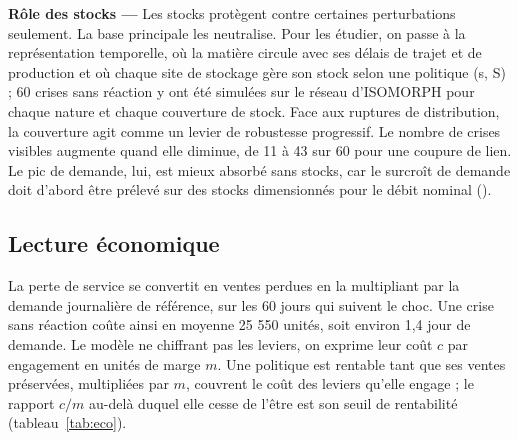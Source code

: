 \begin{center}
\begin{minipage}{\textwidth}\centering

\label{fig:carte}
\end{minipage}
\end{center}

\label{sec:4.4}

\textbf{Rôle des stocks — }Les stocks protègent contre certaines perturbations seulement. La base principale les neutralise. Pour les étudier, on passe à la représentation temporelle, où la matière circule avec ses délais de trajet et de production et où chaque site de stockage gère son stock selon une politique (s, S) ; 60 crises sans réaction y ont été simulées sur le réseau d'ISOMORPH pour chaque nature et chaque couverture de stock. Face aux ruptures de distribution, la couverture agit comme un levier de robustesse progressif. Le nombre de crises visibles augmente quand elle diminue, de 11 à 43 sur 60 pour une coupure de lien. Le pic de demande, lui, est mieux absorbé sans stocks, car le surcroît de demande doit d'abord être prélevé sur des stocks dimensionnés pour le débit nominal ().

\subsection{Lecture économique}
\label{sec:4.5}

La perte de service se convertit en ventes perdues en la multipliant par la demande journalière de référence, sur les 60 jours qui suivent le choc. Une crise sans réaction coûte ainsi en moyenne 25 550 unités, soit environ 1,4 jour de demande. Le modèle ne chiffrant pas les leviers, on exprime leur coût $c$ par engagement en unités de marge $m$. Une politique est rentable tant que ses ventes préservées, multipliées par $m$, couvrent le coût des leviers qu'elle engage ; le rapport $c/m$ au-delà duquel elle cesse de l'être est son seuil de rentabilité (tableau~\ref{tab:eco}).

